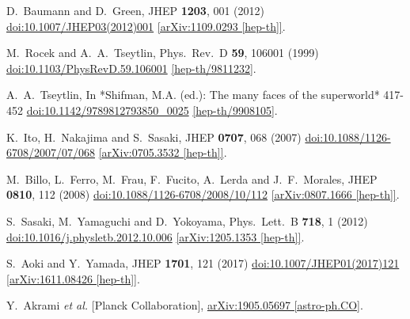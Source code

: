 \documentclass[12pt]{article}
\begin{document}
\begin{thebibliography}{99}
  D.~Baumann and D.~Green,
  JHEP {\bf 1203}, 001 (2012)
  \href{https://dx.doi.org/10.1007/JHEP03(2012)001}{doi:10.1007/JHEP03(2012)001}
  \href{https://arxiv.org/abs/1109.0293}{[arXiv:1109.0293 [hep-th]]}.

  M.~Rocek and A.~A.~Tseytlin,
  Phys.\ Rev.\ D {\bf 59}, 106001 (1999)
  \href{https://dx.doi.org/10.1103/PhysRevD.59.106001}{doi:10.1103/PhysRevD.59.106001}
  \href{https://arxiv.org/abs/hep-th/9811232}{[hep-th/9811232]}.

  A.~A.~Tseytlin,
  In *Shifman, M.A. (ed.): The many faces of the superworld* 417-452
  \href{https://dx.doi.org/10.1142/9789812793850\_0025}{doi:10.1142/9789812793850\_0025}
  \href{https://arxiv.org/abs/hep-th/9908105}{[hep-th/9908105]}.

  K.~Ito, H.~Nakajima and S.~Sasaki,
  JHEP {\bf 0707}, 068 (2007)
  \href{https://dx.doi.org/10.1088/1126-6708/2007/07/068}{doi:10.1088/1126-6708/2007/07/068}
  \href{https://arxiv.org/abs/0705.3532}{[arXiv:0705.3532 [hep-th]]}.

  M.~Billo, L.~Ferro, M.~Frau, F.~Fucito, A.~Lerda and J.~F.~Morales,
  JHEP {\bf 0810}, 112 (2008)
  \href{https://dx.doi.org/10.1088/1126-6708/2008/10/112}{doi:10.1088/1126-6708/2008/10/112}
  \href{https://arxiv.org/abs/0807.1666}{[arXiv:0807.1666 [hep-th]]}.

  S.~Sasaki, M.~Yamaguchi and D.~Yokoyama,
  Phys.\ Lett.\ B {\bf 718}, 1 (2012)
  \href{https://dx.doi.org/10.1016/j.physletb.2012.10.006}{doi:10.1016/j.physletb.2012.10.006}
  \href{https://arxiv.org/abs/1205.1353}{[arXiv:1205.1353 [hep-th]]}.

  S.~Aoki and Y.~Yamada,
  JHEP {\bf 1701}, 121 (2017)
  \href{https://dx.doi.org/10.1007/JHEP01(2017)121}{doi:10.1007/JHEP01(2017)121}
  \href{https://arxiv.org/abs/1611.08426}{[arXiv:1611.08426 [hep-th]]}.

  Y.~Akrami {\it et al.} [Planck Collaboration],
  \href{https://arxiv.org/abs/1905.05697}{arXiv:1905.05697 [astro-ph.CO]}.

\end{thebibliography}
\end{document}
